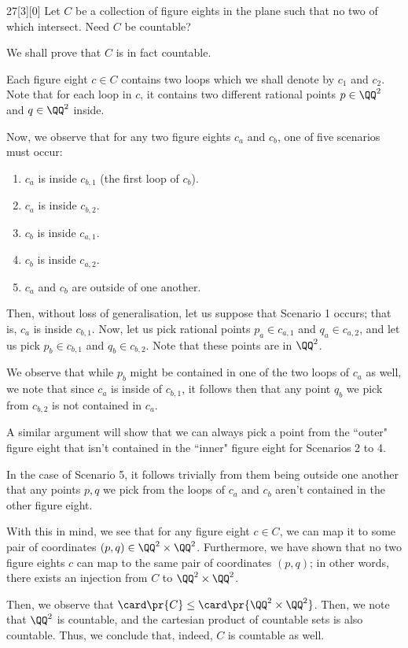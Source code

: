 \documentclass{article}
\begin{document}
\begin{hw}{27}[3][0]
	Let $C$ be a collection of figure eights in the plane such that no two of which intersect. Need $C$ be countable?
\end{hw}
\begin{solution}
	We shall prove that $C$ is in fact countable.
	
	Each figure eight $c \in C$ contains two loops which we shall denote by $c_1$ and $c_2$. Note that for each loop in $c$, it contains two different rational points $p \in \QQ^{2}$ and $q \in \QQ^{2}$ inside.
	
	Now, we observe that for any two figure eights $c_a$ and $c_b$, one of five scenarios must occur:
	\begin{enumerate}
		\item $c_a$ is inside $c_{b,1}$ (the first loop of $c_b$).
		\item $c_a$ is inside $c_{b,2}$.
		\item $c_b$ is inside $c_{a,1}$.
		\item $c_b$ is inside $c_{a,2}$.
		\item $c_a$ and $c_b$ are outside of one another.
	\end{enumerate}

	Then, without loss of generalisation, let us suppose that Scenario 1 occurs; that is, $c_a$ is inside $c_{b,1}$. Now, let us pick rational points $p_a \in c_{a,1}$ and $q_a \in c_{a,2}$, and let us pick $p_b \in c_{b,1}$ and $q_b \in c_{b,2}$. Note that these points are in $\QQ^{2}$.
	
	We observe that while $p_{b}$ might be contained in one of the two loops of $c_a$ as well, we note that since $c_a$ is inside of $c_{b,1}$, it follows then that any point $q_b$ we pick from $c_{b,2}$ is not contained in $c_a$.
	
	A similar argument will show that we can always pick a point from the ``outer" figure eight that isn't contained in the ``inner" figure eight for Scenarios 2 to 4.
	
	In the case of Scenario 5, it follows trivially from them being outside one another that any points $p, q$ we pick from the loops of $c_a$ and $c_b$ aren't contained in the other figure eight.
	
	With this in mind, we see that for any figure eight $c \in C$, we can map it to some pair of coordinates $(p, q) \in \QQ^{2} \times \QQ^{2}$. Furthermore, we have shown that no two figure eights $c$ can map to the same pair of coordinates $(p, q)$; in other words, there exists an injection from $C$ to $\QQ^{2} \times \QQ^{2}$.
	
	Then, we observe that $\card \pr{C} \leq \card \pr{\QQ^{2} \times \QQ^{2}}$. Then, we note that $\QQ^{2}$ is countable, and the cartesian product of countable sets is also countable. Thus, we conclude that, indeed, $C$ is countable as well.
\end{solution}
\end{document}
